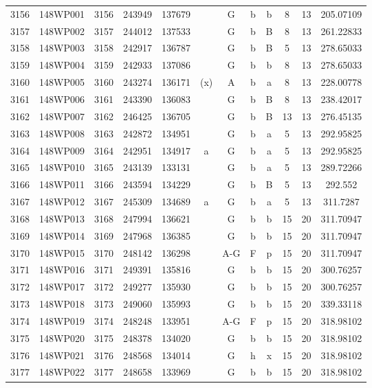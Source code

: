 \begin{tabular}{|*{12}{c|}}
3156 & 148WP001 & 3156 & 243949 & 137679 &  & G & b & b & 8 & 13 & 205.07109 \\ 
3157 & 148WP002 & 3157 & 244012 & 137533 &  & G & b & B & 8 & 13 & 261.22833 \\ 
3158 & 148WP003 & 3158 & 242917 & 136787 &  & G & b & B & 5 & 13 & 278.65033 \\ 
3159 & 148WP004 & 3159 & 242933 & 137086 &  & G & b & b & 8 & 13 & 278.65033 \\ 
3160 & 148WP005 & 3160 & 243274 & 136171 & (x) & A & b & a & 8 & 13 & 228.00778 \\ 
3161 & 148WP006 & 3161 & 243390 & 136083 &  & G & b & B & 8 & 13 & 238.42017 \\ 
3162 & 148WP007 & 3162 & 246425 & 136705 &  & G & b & B & 13 & 13 & 276.45135 \\ 
3163 & 148WP008 & 3163 & 242872 & 134951 &  & G & b & a & 5 & 13 & 292.95825 \\ 
3164 & 148WP009 & 3164 & 242951 & 134917 & a & G & b & a & 5 & 13 & 292.95825 \\ 
3165 & 148WP010 & 3165 & 243139 & 133131 &  & G & b & a & 5 & 13 & 289.72266 \\ 
3166 & 148WP011 & 3166 & 243594 & 134229 &  & G & b & B & 5 & 13 & 292.552 \\ 
3167 & 148WP012 & 3167 & 245309 & 134689 & a & G & b & a & 5 & 13 & 311.7287 \\ 
3168 & 148WP013 & 3168 & 247994 & 136621 &  & G & b & b & 15 & 20 & 311.70947 \\ 
3169 & 148WP014 & 3169 & 247968 & 136385 &  & G & b & b & 15 & 20 & 311.70947 \\ 
3170 & 148WP015 & 3170 & 248142 & 136298 &  & A-G & F & p & 15 & 20 & 311.70947 \\ 
3171 & 148WP016 & 3171 & 249391 & 135816 &  & G & b & b & 15 & 20 & 300.76257 \\ 
3172 & 148WP017 & 3172 & 249277 & 135930 &  & G & b & b & 15 & 20 & 300.76257 \\ 
3173 & 148WP018 & 3173 & 249060 & 135993 &  & G & b & b & 15 & 20 & 339.33118 \\ 
3174 & 148WP019 & 3174 & 248248 & 133951 &  & A-G & F & p & 15 & 20 & 318.98102 \\ 
3175 & 148WP020 & 3175 & 248378 & 134020 &  & G & b & b & 15 & 20 & 318.98102 \\ 
3176 & 148WP021 & 3176 & 248568 & 134014 &  & G & h & x & 15 & 20 & 318.98102 \\ 
3177 & 148WP022 & 3177 & 248658 & 133969 &  & G & b & b & 15 & 20 & 318.98102 \\ 

\end{tabular}
